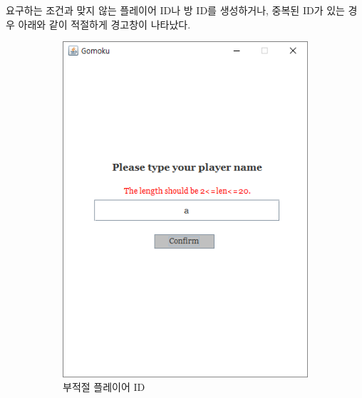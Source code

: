 \documentclass[a4paper, 10pt]{article}
\begin{document}
요구하는 조건과 맞지 않는 플레이어 ID나 방 ID를 생성하거나, 중복된 ID가 있는
경우 아래와 같이 적절하게 경고창이 나타났다.
\begin{figure}[h]
  \centering
  \begin{subfigure}{.24\textwidth}
    \centering
    \includegraphics[width=.9\linewidth]{resource/improper_playerID}
    \caption{부적절 플레이어 ID}
    \label{fig:improper_playerID}
  \end{subfigure}
  \begin{subfigure}{.24\textwidth}
    \centering

\end{subfigure}
\end{figure}
\end{document}
